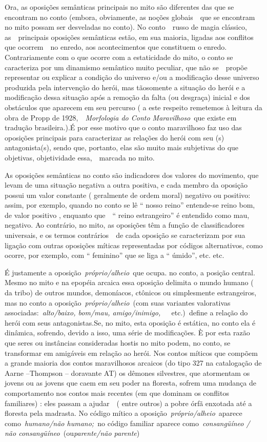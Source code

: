 Ora, as oposições semânticas principais no mito são diferentes das que
se encontram no conto (embora, obviamente, as noções globais~~que se
encontram no mito possam ser desveladas no conto). No conto~~russo de
magia clássico, as~~principais oposições semânticas estão, em sua
maioria, ligadas aos conflitos que ocorrem~~no enredo, aos
acontecimentos que constituem o enredo. Contrariamente com o que ocorre
com a estaticidade do mito, o conto se caracteriza por um dinamismo
semântico muito peculiar, que não se~~propõe representar ou explicar a
condição do universo e/ou a modificação desse universo produzida pela
intervenção do herói, mas tãosomente a situação do herói e a modificação
dessa situação após a remoção da falta (ou desgraça) inicial e dos
obstáculos que aparecem em seu percurso ( a este respeito remetemos à
leitura da obra de Propp de 1928,~~\emph{Morfologia do Conto
Maravilhoso}~que existe em tradução brasileira.).É por esse motivo que o
conto maravilhoso faz uso das oposições principais para caracterizar as
relações do herói com seu (s) antagonista(s), sendo que, portanto, elas
são muito mais subjetivas do que objetivas, objetividade essa,~~marcada
no mito.

As oposições semânticas no conto são indicadores dos valores do
movimento, que levam de uma situação negativa a outra positiva, e cada
membro da oposição possui um valor constante ( geralmente de ordem
moral) negativo ou positivo: assim, por exemplo, quando no conto se lê
`` nosso reino'' entende-se reino bom, de valor positivo , enquanto
que~~`` reino estrangeiro'' é entendido como mau, negativo. Ao
contrário, no mito, as oposições têm a função de classificadores
universais, e os termos contrários~~de cada oposição se caracterizam por
sua ligação com outras oposições míticas representadas por códigos
alternativos, como ocorre, por exemplo, com `` feminino'' que se liga a
`` úmido'', etc. etc.

É justamente a oposição~\emph{próprio/alheio}~que ocupa. no conto, a
posição central. Mesmo no mito e na epopéia arcaica essa oposição
delimita o mundo humano ( da tribo) de outros mundos, demoníacos,
ctônicos ou simplesmente estrangeiros, mas no conto a
oposição~\emph{próprio/alheio}~(com suas variantes valorativas
associadas:~\emph{alto/baixo, bom/mau,
amigo/inimigo,~~}~etc.)\emph{~}define a relação do herói com seus
antagonistas.Se, no mito, esta oposição é estática, no conto ela é
dinâmica, sofrendo, devido a isso, uma série de modificações. È por esta
razão que seres ou instâncias consideradas hostis no mito podem, no
conto, se transformar em amigáveis em relação ao herói. Nos contos
míticos que compõem a grande maioria dos contos maravilhosos arcaicos
(do tipo 327 na catalogação de Aarne --Thompson -- doravante AT) os
dêmones silvestres, que atormentam os jovens ou as jovens que caem em
seu poder na floresta, sofrem uma mudança de comportamento nos contos
mais recentes (em que dominam os conflitos familiares) : eles passam a
ajudar~~( entre outros) a pobre órfã enxotada até a floresta pela
madrasta. No código mítico a oposição~\emph{próprio/alheio}~aparece
como~\emph{humano/não humano;~}no código familiar aparece
como~\emph{consangüíneo / não consangüíneo~}(ou\emph{parente/não
parente})


